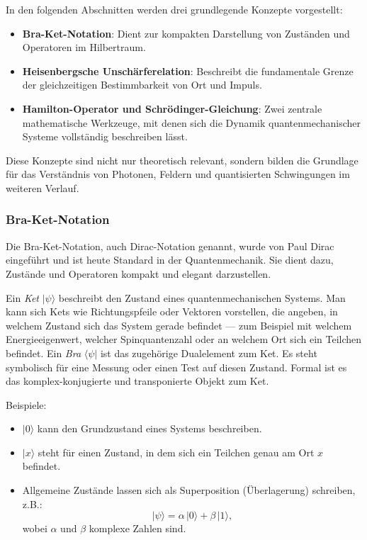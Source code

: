 	In den folgenden Abschnitten werden drei grundlegende Konzepte vorgestellt:
	\begin{itemize}
	\item \textbf{Bra-Ket-Notation}:  
	Dient zur kompakten Darstellung von Zuständen und Operatoren im Hilbertraum.

	\item \textbf{Heisenbergsche Unschärferelation}:  
	Beschreibt die fundamentale Grenze der gleichzeitigen Bestimmbarkeit von Ort und Impuls.

	\item \textbf{Hamilton-Operator und Schrödinger-Gleichung}:  
	Zwei zentrale mathematische Werkzeuge, mit denen sich die Dynamik quantenmechanischer Systeme vollständig beschreiben lässt.
	\end{itemize}

	Diese Konzepte sind nicht nur theoretisch relevant, sondern bilden die Grundlage für das Verständnis von Photonen, Feldern und quantisierten Schwingungen im weiteren Verlauf.

	\subsubsection{Bra-Ket-Notation\label{fourier:subsubsection:braKetNotation}}
		Die Bra-Ket-Notation, auch Dirac-Notation genannt, wurde von Paul Dirac eingeführt und ist heute Standard in der Quantenmechanik.
		Sie dient dazu, Zustände und Operatoren kompakt und elegant darzustellen.

		Ein \emph{Ket} $|\psi\rangle$ beschreibt den Zustand eines quantenmechanischen Systems.
		Man kann sich Kets wie Richtungspfeile oder Vektoren vorstellen, die angeben, in welchem Zustand sich das System gerade befindet ---
		zum Beispiel mit welchem Energieeigenwert, welcher Spinquantenzahl oder an welchem Ort sich ein Teilchen befindet.	Ein \emph{Bra} $\langle\psi|$ ist das zugehörige Dualelement zum Ket.
		Es steht symbolisch für eine Messung oder einen Test auf diesen Zustand.
		Formal ist es das komplex-konjugierte und transponierte Objekt zum Ket.

		Beispiele:
		\begin{itemize}
		\item $|0\rangle$ kann den Grundzustand eines Systems beschreiben.
		\item $|x\rangle$ steht für einen Zustand, in dem sich ein Teilchen genau am Ort $x$ befindet.
		\item Allgemeine Zustände lassen sich als Superposition (Überlagerung) schreiben, z.B.:
		\[
			|\psi\rangle = \alpha\,|0\rangle + \beta\,|1\rangle,
		\]
		wobei $\alpha$ und $\beta$ komplexe Zahlen sind.
		\end{itemize}

